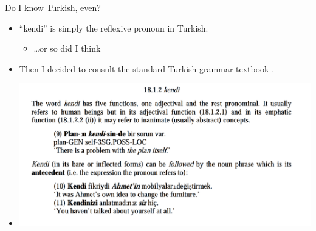 \documentclass{beamer}
\begin{document}
  \begin{frame}{Do I know Turkish, even?}
    \begin{itemize}
      \item<1-> ``kendi'' is simply the reflexive pronoun in Turkish.
        \begin{itemize}
          \item<2-> \dots or so did I think
        \end{itemize}
      \item<3-> Then I decided to consult the standard Turkish grammar
        textbook \cite{goksel2004turkish}.
      \item<4->
        \begin{center}
          \includegraphics[scale=0.3]{resources/kendi-functions.png}
         \end{center}
    \end{itemize}
  \end{frame}

\end{document}
